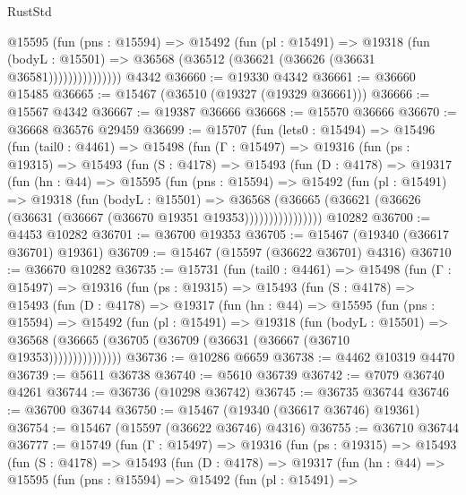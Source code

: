 \begin{lexlean}{RustStd}
\begin{coremodule}
                  @15595
                    (fun (pns : @15594) =>
                    @15492
                      (fun (pl : @15491) =>
                      @19318
                        (fun (bodyL : @15501) =>
                        @36568 (@36512 (@36621 (@36626 (@36631 @36581)))))))))))))))
    @4342
@36660 := @19330 @4342
@36661 := @36660 @15485
@36665 := @15467 (@36510 (@19327 (@19329 @36661)))
@36666 := @15567 @4342
@36667 := @19387 @36666
@36668 := @15570 @36666
@36670 := @36668 @36576 @29459
@36699 := @15707
    (fun (lets0 : @15494) =>
    @15496
      (fun (tail0 : @4461) =>
      @15498
        (fun (Γ : @15497) =>
        @19316
          (fun (ps : @19315) =>
          @15493
            (fun (S : @4178) =>
            @15493
              (fun (D : @4178) =>
              @19317
                (fun (hn : @44) =>
                @15595
                  (fun (pns : @15594) =>
                  @15492
                    (fun (pl : @15491) =>
                    @19318
                      (fun (bodyL : @15501) =>
                      @36568
                        (@36665
                          (@36621 (@36626 (@36631 (@36667 (@36670 @19351 @19353))))))))))))))))
    @10282
@36700 := @4453 @10282
@36701 := @36700 @19353
@36705 := @15467 (@19340 (@36617 @36701) @19361)
@36709 := @15467 (@15597 (@36622 @36701) @4316)
@36710 := @36670 @10282
@36735 := @15731
    (fun (tail0 : @4461) =>
    @15498
      (fun (Γ : @15497) =>
      @19316
        (fun (ps : @19315) =>
        @15493
          (fun (S : @4178) =>
          @15493
            (fun (D : @4178) =>
            @19317
              (fun (hn : @44) =>
              @15595
                (fun (pns : @15594) =>
                @15492
                  (fun (pl : @15491) =>
                  @19318
                    (fun (bodyL : @15501) =>
                    @36568 (@36665 (@36705 (@36709 (@36631 (@36667 (@36710 @19353)))))))))))))))
@36736 := @10286 @6659
@36738 := @4462 @10319 @4470
@36739 := @5611 @36738
@36740 := @5610 @36739
@36742 := @7079 @36740 @4261
@36744 := @36736 (@10298 @36742)
@36745 := @36735 @36744
@36746 := @36700 @36744
@36750 := @15467 (@19340 (@36617 @36746) @19361)
@36754 := @15467 (@15597 (@36622 @36746) @4316)
@36755 := @36710 @36744
@36777 := @15749
    (fun (Γ : @15497) =>
    @19316
      (fun (ps : @19315) =>
      @15493
        (fun (S : @4178) =>
        @15493
          (fun (D : @4178) =>
          @19317
            (fun (hn : @44) =>
            @15595
              (fun (pns : @15594) =>
              @15492
                (fun (pl : @15491) =>

\end{coremodule}
\end{lexlean}
